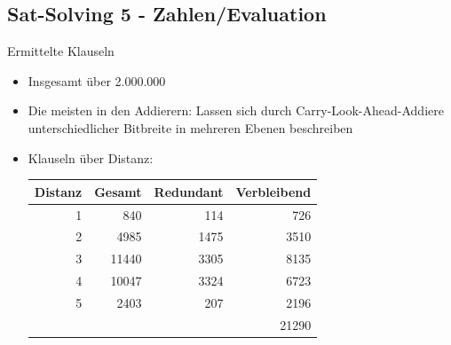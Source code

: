 \documentclass{beamer}
\begin{document}
  \subsection{Sat-Solving 5 - Zahlen/Evaluation}
    \begin{frame}{Ermittelte Klauseln}
      \begin{itemize}
        \item Insgesamt über 2.000.000
        \item Die meisten in den Addierern: Lassen sich durch Carry-Look-Ahead-Addiere unterschiedlicher Bitbreite in mehreren Ebenen beschreiben
        \item Klauseln über Distanz:\newline
        \begin{tabular}{rrrr}
          Distanz & Gesamt & Redundant & Verbleibend\\
          \hline
                1 &    840 &       114 &   726\\
                2 &   4985 &      1475 &  3510\\
                3 &  11440 &      3305 &  8135\\
                4 &  10047 &      3324 &  6723\\
                5 &   2403 &       207 &  2196\\
          \hline
                  &        &           & 21290
        \end{tabular}
      \end{itemize}
    \end{frame}
\end{document}
